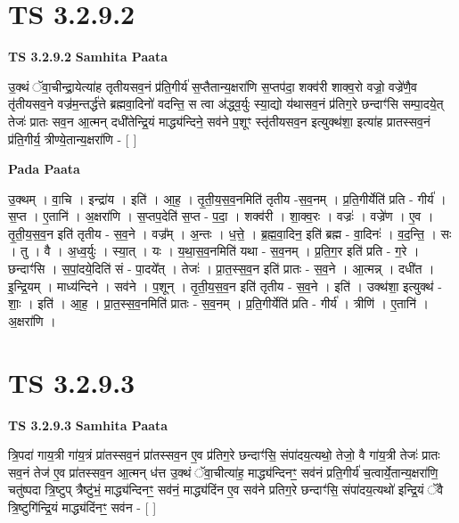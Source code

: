 \documentclass[17pt]{extarticle}
\begin{document}
\section*{ TS 3.2.9.2 }

\textbf{TS 3.2.9.2 } \newline
\textbf{Samhita Paata} \newline

उ॒क्थं ॅवा॒चीन्द्रा॒येत्या॑ह तृतीयसव॒नं प्र॑ति॒गीर्य॑ स॒प्तैतान्य॒क्षरा॑णि स॒प्तप॑दा॒ शक्व॑री शाक्व॒रो वज्रो॒ वज्रे॑णै॒व तृ॑तीयसव॒ने वज्र॑म॒न्तर्द्ध॑त्ते ब्रह्मवा॒दिनो॑ वदन्ति॒ स त्वा अ॑द्ध्व॒र्युः स्या॒द्यो य॑थासव॒नं प्र॑तिग॒रे छन्दाꣳ॑सि सम्पा॒दये॒त् तेजः॑ प्रातः सव॒न आ॒त्मन् दधी॑तेन्द्रि॒यं माद्ध्य॑न्दिने॒ सव॑ने प॒शूꣳ स्तृ॑तीयसव॒न इत्युक्थ॑शा॒ इत्या॑ह प्रातस्सव॒नं प्र॑ति॒गीर्य॒ त्रीण्ये॒तान्य॒क्षरा॑णि - [  ] \newline

\textbf{Pada Paata} \newline

उ॒क्थम् । वा॒चि । इन्द्रा॑य । इति॑ । आ॒ह॒ । तृ॒ती॒य॒स॒व॒नमिति॑ तृतीय -स॒व॒नम् । प्र॒ति॒गीर्येति॑ प्रति - गीर्य॑ । स॒प्त । ए॒तानि॑ । अ॒क्षरा॑णि । स॒प्तप॒देति॑ स॒प्त - प॒दा॒ । शक्व॑री । शा॒क्व॒रः । वज्रः॑ । वज्रे॑ण । ए॒व । तृ॒ती॒य॒स॒व॒न इति॑ तृतीय - स॒व॒ने । वज्र᳚म् । अ॒न्तः । ध॒त्ते॒ । ब्र॒ह्म॒वा॒दिन॒ इति॑ ब्रह्म - वा॒दिनः॑ । व॒द॒न्ति॒ । सः । तु । वै । अ॒ध्व॒र्युः । स्या॒त् । यः । य॒था॒स॒व॒नमिति॑ यथा - स॒व॒नम् । प्र॒ति॒ग॒र इति॑ प्रति - ग॒रे । छन्दाꣳ॑सि । स॒पां॒दये॒दिति॑ सं - पा॒दये᳚त् । तेजः॑ । प्रा॒त॒स्स॒व॒न इति॑ प्रातः - स॒व॒ने । आ॒त्मन्न् । दधी॑त । इ॒न्द्रि॒यम् । माध्य॑न्दिने । सव॑ने । प॒शून् । तृ॒ती॒य॒स॒व॒न इति॑ तृतीय - स॒व॒ने । इति॑ । उक्थ॑शा॒ इत्युक्थ॑ - शाः॒ । इति॑ । आ॒ह॒ । प्रा॒त॒स्स॒व॒नमिति॑ प्रातः - स॒व॒नम् । प्र॒ति॒गीर्येति॑ प्रति - गीर्य॑ । त्रीणि॑ । ए॒तानि॑ । अ॒क्षरा॑णि ।  \newline




\section*{ TS 3.2.9.3 }

\textbf{TS 3.2.9.3 } \newline
\textbf{Samhita Paata} \newline

त्रि॒पदा॑ गाय॒त्री गा॑य॒त्रं प्रा॑तस्सव॒नं प्रा॑तस्सव॒न ए॒व प्र॑तिग॒रे छन्दाꣳ॑सि॒ संपा॑दय॒त्यथो॒ तेजो॒ वै गा॑य॒त्री तेजः॑ प्रातः सव॒नं तेज॑ ए॒व प्रा॑तस्सव॒न आ॒त्मन् ध॑त्त उ॒क्थं ॅवा॒चीत्या॑ह॒ माद्ध्य॑न्दिनꣳ॒॒ सव॑नं प्रति॒गीर्य॑ च॒त्वार्ये॒तान्य॒क्षरा॑णि॒ चतु॑ष्पदा त्रि॒ष्टुप् त्रैष्टु॑भं॒ माद्ध्य॑न्दिनꣳ॒॒ सव॑नं॒ माद्ध्य॑दिंन ए॒व सव॑ने प्रतिग॒रे छन्दाꣳ॑सि॒ संपा॑दय॒त्यथो॑ इन्द्रि॒यं ॅवै त्रि॒ष्टुगि॑न्द्रि॒यं माद्ध्य॑दिंनꣳ॒॒ सव॑न - [  ] \newline
\end{document}
